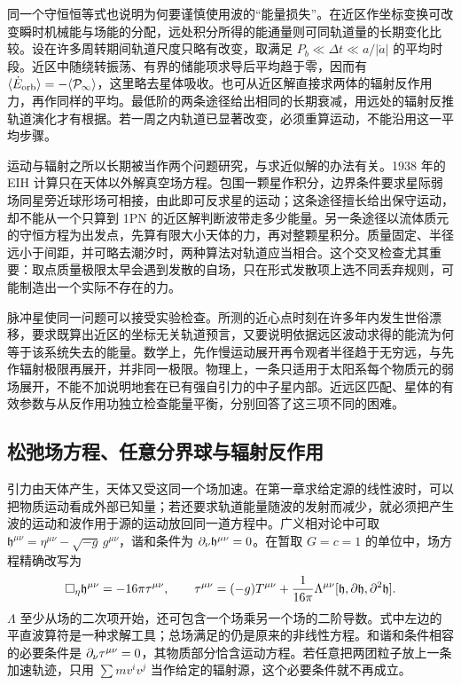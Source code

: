 同一个守恒恒等式也说明为何要谨慎使用波的“能量损失”。在近区作坐标变换可改变瞬时机械能与场能的分配，远处积分所得的能通量则可同轨道量的长期变化比较。设在许多周转期间轨道尺度只略有改变，取满足 $P_b\ll\Delta t\ll a/|\dot a|$ 的平均时段。近区中随绕转振荡、有界的储能项求导后平均趋于零，因而有 $\langle\dot E_{\rm orb}\rangle=-\langle\mathcal P_\infty\rangle$，这里略去星体吸收。也可从近区解直接求两体的辐射反作用力，再作同样的平均。最低阶的两条途径给出相同的长期衰减，用远处的辐射反推轨道演化才有根据。若一周之内轨道已显著改变，必须重算运动，不能沿用这一平均步骤。

运动与辐射之所以长期被当作两个问题研究，与求近似解的办法有关。1938 年的 EIH 计算只在天体以外解真空场方程。包围一颗星作积分，边界条件要求星际弱场同星旁近球形场可相接，由此即可反求星的运动；这条途径擅长给出保守运动，却不能从一个只算到 1PN 的近区解判断波带走多少能量。另一条途径以流体质元的守恒方程为出发点，先算有限大小天体的力，再对整颗星积分。质量固定、半径远小于间距，并可略去潮汐时，两种算法对轨道应当相合。这个交叉检查尤其重要：取点质量极限太早会遇到发散的自场，只在形式发散项上选不同丢弃规则，可能制造出一个实际不存在的力。

脉冲星使同一问题可以接受实验检查。所测的近心点时刻在许多年内发生世俗漂移，要求既算出近区的坐标无关轨道预言，又要说明依据远区波动求得的能流为何等于该系统失去的能量。数学上，先作慢运动展开再令观者半径趋于无穷远，与先作辐射极限再展开，并非同一极限。物理上，一条只适用于太阳系每个物质元的弱场展开，不能不加说明地套在已有强自引力的中子星内部。近远区匹配、星体的有效参数与从反作用功独立检查能量平衡，分别回答了这三项不同的困难。

\subsection{松弛场方程、任意分界球与辐射反作用}

引力由天体产生，天体又受这同一个场加速。在第一章求给定源的线性波时，可以把物质运动看成外部已知量；若还要求轨道能量随波的发射而减少，就必须把产生波的运动和波作用于源的运动放回同一道方程中。广义相对论中可取 $\mathfrak h^{\mu\nu}=\eta^{\mu\nu}-\sqrt{-g}\,g^{\mu\nu}$，谐和条件为 $\partial_\nu\mathfrak h^{\mu\nu}=0$。在暂取 $G=c=1$ 的单位中，场方程精确改写为
\[
 \square_\eta\mathfrak h^{\mu\nu}=-16\pi\tau^{\mu\nu},\qquad
 \tau^{\mu\nu}=(-g)T^{\mu\nu}+\frac1{16\pi}\Lambda^{\mu\nu}
                [\mathfrak h,\partial\mathfrak h,\partial^2\mathfrak h].
\]
$\Lambda$ 至少从场的二次项开始，还可包含一个场乘另一个场的二阶导数。式中左边的平直波算符是一种求解工具；总场满足的仍是原来的非线性方程。和谐和条件相容的必要条件是 $\partial_\nu\tau^{\mu\nu}=0$，其物质部分恰含运动方程。若任意把两团粒子放上一条加速轨迹，只用 $\sum m v^iv^j$ 当作给定的辐射源，这个必要条件就不再成立。

